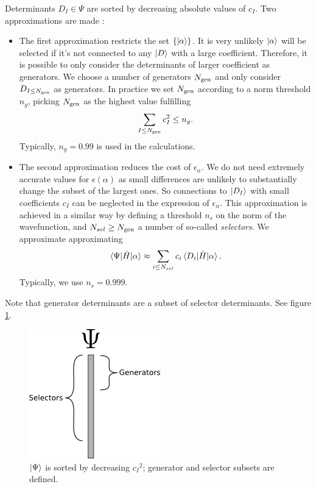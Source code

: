 \documentclass[./thesis.tex]{subfiles}
\begin{document}
Determinants $D_I \in \Psi$ are sorted by decreasing absolute values of $c_I$. Two approximations are made :

\begin{itemize}
\item
The first approximation restricts the set $\{{\ket{\alpha}}\}$. It is very unlikely $\ket \alpha$ will be selected if it's not connected to any $\ket D$ with a large coefficient. Therefore, it is possible to only consider the determinants of larger coefficient as generators. We choose a number of generators ${N_\text{gen}}$ and only consider $D_{I \leq {N_\text{gen}}}$ as generators. In practice we set ${N_\text{gen}}$ according to a norm threshold $n_g$, picking ${N_\text{gen}}$ as the highest value fulfilling
\begin{equation}
\sum_{I \leq {N_\text{gen}}} c_I^2 \leq n_g.
\end{equation}
Typically, $n_g=0.99$ is used in the calculations.
\item The second approximation reduces the cost of $\epsilon_\alpha$.
We do not need extremely accurate values for $\epsilon(\alpha)$ as small differences are unlikely to substantially change the subset of the largest ones.
So  connections to $\ket {D_I}$ with small coefficients $c_I$ can be neglected
in the expression of $\epsilon_\alpha$.
This approximation is achieved in a similar way by defining a threshold $n_s$
on the norm of the wavefunction, and $N_{sel} \geq {N_\text{gen}}$ a number of so-called
\emph{selectors}. We approximate approximating
\begin{equation}
  \mel{\Psi}{\hat{H}}{\alpha} \approx \sum_{i \leq N_{sel}} c_i \mel{D_i}{\hat{H}}{\alpha}.
\end{equation}
Typically, we use $n_s = 0.999$.

\end{itemize}

Note that generator determinants are a subset of selector determinants. See figure \ref{fig:generators_selectors}.


\begin{figure}[h!]
	
	\begin{center}
		\includegraphics[width=0.4\columnwidth]{figures/cipsi/selexemple2}
		\caption{$\ket \Psi$ is sorted by decreasing ${c_I}^2$; generator and selector subsets are defined.}
		\label{fig:generators_selectors}
	\end{center}
\end{figure}
\end{document}
